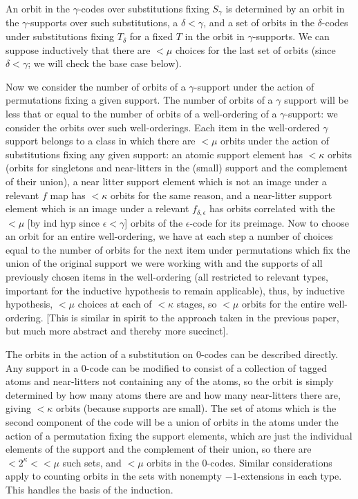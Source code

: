 \documentclass[12pt]{article}
\begin{document}
\begin{enumerate}
An orbit in the $\gamma$-codes over substitutions fixing $S_\gamma$ is determined by an orbit in the $\gamma$-supports over such substitutions, a $\delta<\gamma$, and a set of orbits in the $\delta$-codes under substitutions fixing $T_\delta$ for a fixed  $T$ in the orbit in $\gamma$-supports.
We can suppose inductively that there are $<\mu$ choices for the last set of orbits (since $\delta<\gamma$; we will check the base case below). 

Now we consider the number of orbits of a $\gamma$-support under the action of permutations fixing a given support.  The number of orbits of a $\gamma$ support will be less that or equal to the number of orbits of a well-ordering of a $\gamma$-support:  we consider the orbits over such well-orderings.
Each item in the well-ordered $\gamma$ support belongs to a class in which there are $<\mu$ orbits under the action of substitutions fixing any given support:  an atomic support element has $<\kappa$ orbits (orbits for singletons and near-litters in the (small) support and the complement of their union),
a near litter support element which is not an image under a relevant $f$ map has $<\kappa$ orbits for the same reason, and a near-litter support element which is an image under a relevant $f_{\delta,\epsilon}$ has orbits correlated with the $<\mu$ [by ind hyp since $\epsilon<\gamma$] orbits of the $\epsilon$-code for its preimage.  Now to choose an orbit for an entire well-ordering, we have at each step a number of choices equal to the number of orbits for the next item under permutations which fix the union of the original support we were working with and the supports of all previously chosen items in the well-ordering (all restricted to relevant types, important for the inductive hypothesis to remain applicable), thus,
by inductive hypothesis, $<\mu$ choices at each of $<\kappa$ stages, so $<\mu$ orbits for the entire well-ordering.  [This is similar in spirit to the approach taken in the previous paper, but much more abstract and thereby more succinct].

The orbits in the action of a substitution on 0-codes can be described directly.  Any support in a 0-code can be modified to consist of a collection of tagged atoms and near-litters not containing any of the atoms, so the orbit is simply determined by how many atoms
there are and how many near-litters there are, giving $<\kappa$ orbits (because supports are small).  The set of atoms which is the second component of the code will be a union of orbits in the atoms under the action of a permutation fixing the support elements, which are just
the individual elements of the support and the complement of their union, so there are $<2^{\kappa}<<\mu$ such sets, and $<\mu$ orbits in the 0-codes.  Similar considerations apply to counting orbits in the sets with nonempty $-1$-extensions in each type.  This handles the basis of the induction.


\end{enumerate}
\end{document}
